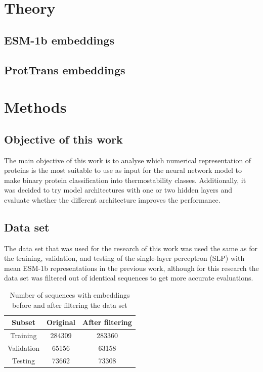 \documentclass[12pt]{article}
\begin{document}
	\begin{otherlanguage}{lithuanian}
		
	\end{otherlanguage}
	
	\newpage

	\section{Theory}

	\subsection{ESM-1b embeddings}

	\subsection{ProtTrans embeddings}

	\newpage

	\section{Methods}

	\subsection{Objective of this work}

	The main objective of this work is to analyse 
	which numerical representation of proteins is the most 
	suitable to use as input for the neural network 
	model to make binary protein classification into thermostability
	classes. Additionally, it was decided to try model 
	architectures with one or two hidden layers and evaluate 
	whether the different architecture improves the 
	performance.

	\subsection{Data set}

	The data set that was used for the research of this work was 
	used the same as for the training, validation, and testing of 
	the single-layer perceptron (SLP) with mean ESM-1b 
	representations in the previous work, although for this 
	research the data set was filtered out of identical sequences to 
	get more accurate evaluations.

	\begin{table}[h!]
		\caption{Number of sequences with embeddings before and after 
		filtering the data set}
		\vspace{0.2cm}
		\centering
		\begin{tabular}{ | c | c c | }
			\hline 
			Subset & Original & After filtering \\
			\hline 
			Training & 284309 & 283360 \\
			Validation & 65156 & 63158 \\
			Testing & 73662 & 73308 \\
			\hline    
		\end{tabular}
		\label{table:numberEmbeddings}
	\end{table}
\end{document}
